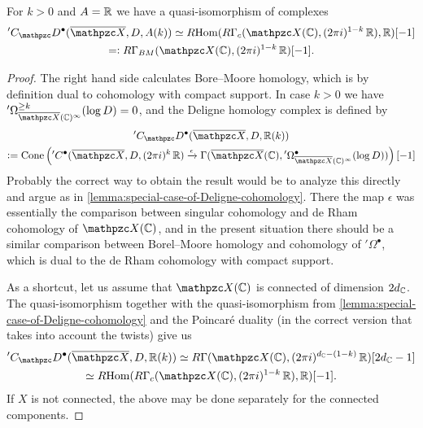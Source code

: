 \begin{lemma}
  \label{lemma:special-case-of-Deligne-homology}
  For $k > 0$ and $A = \mathbb{R}$ we have a quasi-isomorphism of complexes
  \begin{multline*}
    {}' C_\mathcal{D}^\bullet (\overline{\mathcal{X}}, D, A (k)) \quiso
    \RHom (R\Gamma_c (\mathcal{X} (\CC), (2\pi i)^{1-k}\,\RR), \RR) [-1] \\
    \rdfn R\Gamma_{BM} (\mathcal{X} (\CC), (2\pi i)^{1-k}\,\RR) [-1].
  \end{multline*}

  \begin{proof} The right hand side calculates Bore--Moore homology, which is by
    definition dual to cohomology with compact support. In case $k > 0$ we have
    ${}' \Omega^{\ge k}_{\overline{\mathcal{X}} (\CC)^\infty} (\log D) = 0$, and
    the Deligne homology complex is defined by
    \begin{multline*}
      {}' C_\mathcal{D}^\bullet (\overline{\mathcal{X}}, D, \RR (k)) \\
      \dfn \Cone \left(
        {}' C^\bullet (\overline{\mathcal{X}}, D, (2\pi i)^k\,\RR)
        \xrightarrow{\epsilon}
        \Gamma (\overline{\mathcal{X}} (\CC), {}' \Omega^\bullet_{\overline{\mathcal{X}} (\CC)^\infty} (\log D))
      \right) [-1]
    \end{multline*}
    Probably the correct way to obtain the result would be to analyze this
    directly and argue as in
    \ref{lemma:special-case-of-Deligne-cohomology}. There the map $\epsilon$ was
    essentially the comparison between singular cohomology and de Rham
    cohomology of $\mathcal{X} (\CC)$, and in the present situation there should
    be a similar comparison between Borel--Moore homology and cohomology of
    ${}' \Omega^\bullet$, which is dual to the de Rham cohomology with compact
    support.

    As a shortcut, let us assume that $\mathcal{X} (\CC)$ is connected of
    dimension $2d_{\mathbb{C}}$. The quasi-isomorphism
     together with
    the quasi-isomorphism from \ref{lemma:special-case-of-Deligne-cohomology}
    and the Poincaré duality (in the correct version that takes into account the
    twists) give us
    \begin{multline*}
      {}' C_\mathcal{D}^\bullet (\overline{\mathcal{X}}, D, \RR (k))
      \quiso R\Gamma (\mathcal{X} (\CC), (2\pi i)^{d_\CC - (1-k)}\,\RR) [2d_\CC - 1] \\
      \quiso \RHom (R\Gamma_c (\mathcal{X} (\CC), (2\pi i)^{1-k}\,\RR), \RR) [-1].
    \end{multline*}
    If $X$ is not connected, the above may be done separately for the connected
    components.
  \end{proof}
\end{lemma}

